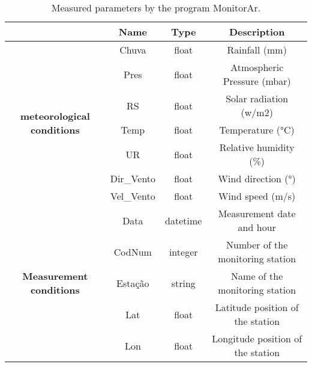 \begin{table*}[t]
    \centering
    \begin{tabular}{c|c|c|c|}
        \cline{2-4}
       & \textbf{Name} & \textbf{Type} & \textbf{Description}              \\ \hline
        \multicolumn{1}{|c|}{\multirow{7}{*}{\textbf{meteorological conditions}}} & Chuva         & float         & Rainfall (mm)                     \\ \cline{2-4} 
        \multicolumn{1}{|c|}{}                                                   & Pres          & float         & Atmospheric Pressure (mbar)       \\ \cline{2-4} 
        \multicolumn{1}{|c|}{}                                                   & RS            & float         & Solar radiation (w/m2)            \\ \cline{2-4} 
        \multicolumn{1}{|c|}{}                                                   & Temp          & float         & Temperature (°C)                  \\ \cline{2-4} 
        \multicolumn{1}{|c|}{}                                                   & UR            & float         & Relative humidity (\%)            \\ \cline{2-4} 
        \multicolumn{1}{|c|}{}                                                   & Dir\_Vento    & float         & Wind direction (°)                \\ \cline{2-4} 
        \multicolumn{1}{|c|}{}                                                   & Vel\_Vento    & float         & Wind speed (m/s)                  \\ \hline
        \multicolumn{1}{|c|}{\multirow{5}{*}{\textbf{Measurement conditions}}}   & Data          & datetime      & Measurement date and hour         \\ \cline{2-4} 
        \multicolumn{1}{|c|}{}                                                   & CodNum        & integer        & Number of the monitoring station  \\ \cline{2-4} 
        \multicolumn{1}{|c|}{}                                                   & Estação       & string        & Name of the monitoring station    \\ \cline{2-4} 
        \multicolumn{1}{|c|}{}                                                   & Lat           & float         & Latitude position of the station  \\ \cline{2-4} 
        \multicolumn{1}{|c|}{}                                                   & Lon           & float         & Longitude position of the station \\ \hline
        \end{tabular}
    \caption{Measured parameters by the program MonitorAr.}
    \label{tab:measured-data}
\end{table*}

